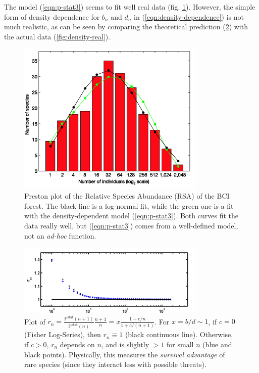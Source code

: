 \documentclass[../../main.tex]{subfiles}
\begin{document}
The model (\ref{eqn:p-stat3}) seems to fit well real data (fig. \ref{fig:preston-fits2}). However, the simple form of density dependence for $b_n$ and $d_n$ in (\ref{eqn:density-dependence}) is not much realistic, as can be seen by comparing the theoretical prediction (\ref{fig:density-dependence}) with the actual data (\ref{fig:density-real}).


\begin{figure}[H]
    \centering
    \includegraphics[width=0.8\textwidth]{preston-fits2.png}
    \caption{Preston plot of the Relative Species Abundance (RSA) of the BCI forest. The black line is a log-normal fit, while the green one is a fit with the density-dependent model (\ref{eqn:p-stat3}). Both curves fit the data really well, but (\ref{eqn:p-stat3}) comes from a well-defined model, not an \textit{ad-hoc} function.}
    \label{fig:preston-fits2}
\end{figure}



\begin{figure}[H]
    \centering
    \includegraphics[width=0.8\textwidth]{density-dependence.png}
    \caption{Plot of $r_n = \frac{\mathbb{P}^{\mathrm{stat}}(n+1)}{\mathbb{P}^{\mathrm{stat}}(n)} \frac{n+1}{n} = x \frac{1+c/n}{1 + c/(n+1)}$. For $x = b/d \sim 1$, if $c = 0$ (Fisher Log-Series), then $r_n \equiv 1$ (black continuous line). Otherwise, if $c > 0$, $r_n$ depends on $n$, and is slightly $>1$ for small $n$ (blue and black points). Physically, this measures the \textit{survival advantage} of rare species (since they interact less with possible threats).}
    \label{fig:density-dependence}
\end{figure}
\end{document}
